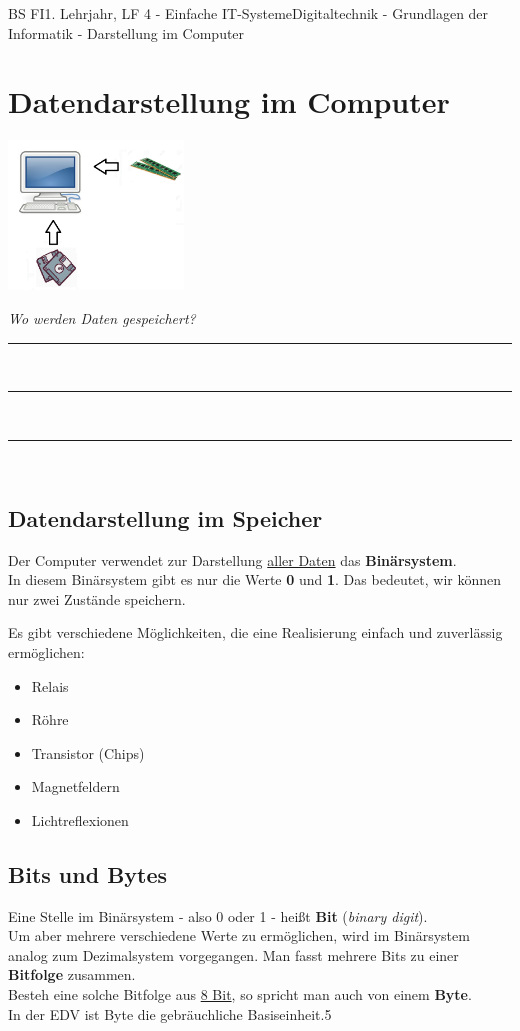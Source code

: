 \documentclass[11pt,twocolumn,oneside,openany,headings=optiontotoc,11pt,numbers=noenddot]{article}
\begin{document}
	\begin{worksheet}{BS FI}{1. Lehrjahr, LF 4 - Einfache IT-Systeme}{Digitaltechnik - Grundlagen der Informatik - Darstellung im Computer}
		\section{Datendarstellung im Computer}
		\begin{center}
			\includegraphics[width=0.35\textwidth]{../99_Bilder/overview.png}
		\end{center}
		
		\textit{Wo werden Daten gespeichert?}\\
		\par
		\rule{0.43\textwidth}{0.1pt}\\
		\par
		\rule{0.43\textwidth}{0.1pt}\\
		\par
		\rule{0.43\textwidth}{0.1pt}\\
		\subsection*{Datendarstellung im Speicher} Der Computer verwendet zur Darstellung \underline{aller Daten} das \textbf{Binärsystem}.\\
		In diesem Binärsystem gibt es nur die Werte \textbf{0} und \textbf{1}. Das bedeutet, wir können nur zwei Zustände speichern.\\
		\par\noindent
		Es gibt verschiedene Möglichkeiten, die eine Realisierung einfach und zuverlässig ermöglichen:
		\begin{itemize}
			\item Relais
			\item Röhre
			\item Transistor (Chips)
			\item Magnetfeldern
			\item Lichtreflexionen
		\end{itemize}
		\subsection*{Bits und Bytes}
		Eine Stelle im Binärsystem - also 0 oder 1 - heißt \textbf{Bit} (\textit{binary digit}).\\
		Um aber mehrere verschiedene Werte zu ermöglichen, wird im Binärsystem analog zum Dezimalsystem vorgegangen. Man fasst mehrere Bits zu einer \textbf{Bitfolge} zusammen.\\
		Besteh eine solche Bitfolge aus \underline{8 Bit}, so spricht man auch von einem \textbf{Byte}.\\
		In der EDV ist Byte die gebräuchliche Basiseinheit.5

\end{worksheet}
\end{document}
